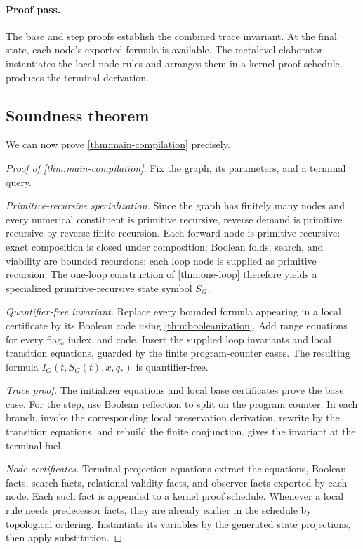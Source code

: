\paragraph{Proof pass.}
The base and step proofs establish the combined trace invariant.  At the final state, each node's exported formula is available.  The metalevel elaborator instantiates the local node rules and arranges them in a kernel proof schedule.   produces the terminal derivation.

\subsection{Soundness theorem}

We can now prove \cref{thm:main-compilation} precisely.

\begin{proof}[Proof of \cref{thm:main-compilation}]
Fix the graph, its parameters, and a terminal query.

\emph{Primitive-recursive specialization.}  Since the graph has finitely many nodes and every numerical constituent is primitive recursive, reverse demand is primitive recursive by reverse finite recursion.  Each forward node is primitive recursive: exact composition is closed under composition; Boolean folds, search, and viability are bounded recursions; each loop node is supplied as primitive recursion.  The one-loop construction of \cref{thm:one-loop} therefore yields a specialized primitive-recursive state symbol \(S_G\).

\emph{Quantifier-free invariant.}  Replace every bounded formula appearing in a local certificate by its Boolean code using \cref{thm:booleanization}.  Add range equations for every flag, index, and code.  Insert the supplied loop invariants and local transition equations, guarded by the finite program-counter cases.  The resulting formula \(I_G(t,S_G(t),x,q_*)\) is quantifier-free.

\emph{Trace proof.}  The initializer equations and local base certificates prove the base case.  For the step, use Boolean reflection to split on the program counter.  In each branch, invoke the corresponding local preservation derivation, rewrite by the transition equations, and rebuild the finite conjunction.   gives the invariant at the terminal fuel.

\emph{Node certificates.}  Terminal projection equations extract the equations, Boolean facts, search facts, relational validity facts, and observer facts exported by each node.  Each such fact is appended to a kernel proof schedule.  Whenever a local rule needs predecessor facts, they are already earlier in the schedule by topological ordering.  Instantiate its variables by the generated state projections, then apply substitution.


\end{proof}
